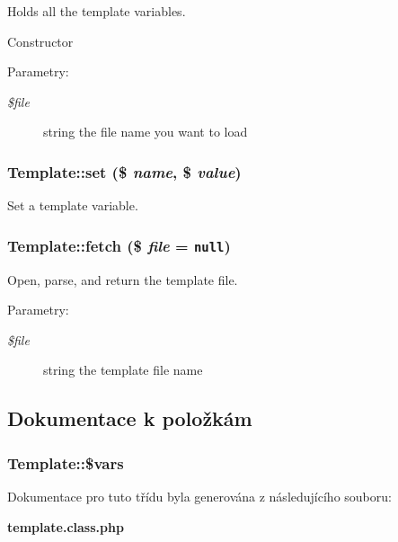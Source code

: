 Holds all the template variables. 

Constructor

\begin{Desc}
\item[Parametry:]
\begin{description}
\item[{\em \$file}]string the file name you want to load \end{description}
\end{Desc}
\subsubsection{\setlength{\rightskip}{0pt plus 5cm}Template::set (\$ {\em name}, \$ {\em value})}\label{classTemplate_b1c9904c0a6f4242cc5e4392b63a241d}


Set a template variable. 
\subsubsection{\setlength{\rightskip}{0pt plus 5cm}Template::fetch (\$ {\em file} = {\tt null})}\label{classTemplate_9d4da74dc991725da1603fe9ea9380c9}


Open, parse, and return the template file.

\begin{Desc}
\item[Parametry:]
\begin{description}
\item[{\em \$file}]string the template file name \end{description}
\end{Desc}


\subsection{Dokumentace k položkám}
\subsubsection{\setlength{\rightskip}{0pt plus 5cm}Template::\$vars}\label{classTemplate_4ea3fb3e81eb30dae82ef45493d84bf3}




Dokumentace pro tuto třídu byla generována z následujícího souboru:\begin{CompactItemize}
\item 
{\bf template.class.php}\end{CompactItemize}
